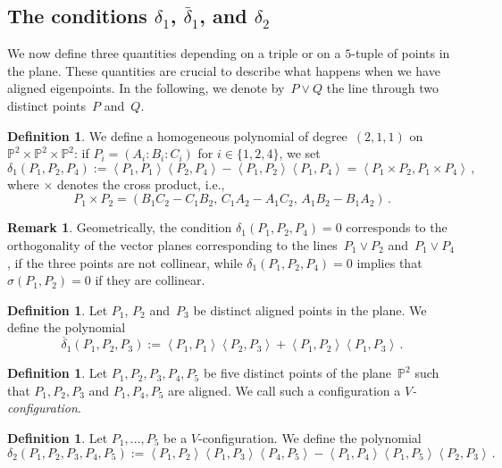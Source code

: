 \documentclass[a4paper, 11pt, reqno]{amsart}
\theoremstyle{plain}
\theoremstyle{definition}
\newtheorem{definition}[lemma]{Definition}
\newtheorem{rmk}[lemma]{Remark}
\newcommand{\p}{\mathbb{P}}
\newcommand{\scl}[2]{\left\langle {#1}, {#2} \right\rangle}
\begin{document}
\subsection{The conditions \texorpdfstring{$\delta_1$}{delta1}, \texorpdfstring{$\bar{\delta}_1$}{deltabar1}, and \texorpdfstring{$\delta_2$}{delta2}}

We now define three quantities depending on a triple or on a $5$-tuple of points in the plane.
These quantities are crucial to describe what happens when we have aligned eigenpoints.
In the following, we denote by~$P \vee Q$ the line through two distinct points~$P$ and~$Q$.

\begin{definition}
\label{definition:delta1}
We define a homogeneous polynomial of degree~$(2,1,1)$ on $\p^2 \times \p^2 \times \p^2$:
if $P_i = (A_i: B_i: C_i)$ for $i \in \{1, 2, 4\}$, we set
%
\[
  \delta_1(P_1, P_2, P_4) :=
  \scl{P_1}{P_1} \scl{P_2}{P_4} - \scl{P_1}{P_2}\scl{P_1}{P_4} =
  \scl{P_1\times P_2}{P_1 \times P_4} \,,
\]
%
where $\times$ denotes the cross product, i.e.,
%
\[
  P_1 \times P_2 = 
  (B_1 C_2 - C_1 B_2, \, C_1 A_2 - A_1 C_2, \, A_1 B_2 - B_1 A_2) \,.
\]
%
\end{definition}

\begin{rmk}
\label{rmk:delta1_meaning}
Geometrically, the condition $\delta_1(P_1, P_2, P_4) = 0$ corresponds to the orthogonality of the vector planes corresponding to the lines~$P_1 \vee P_2$ and~$P_1 \vee P_4$, if the three points are not collinear, while
$\delta_1(P_1, P_2, P_4) = 0$ implies that $\sigma (P_1,P_2)=0$ if they are collinear.
\end{rmk}

\begin{definition}
\label{definition:delta1b}
Let $P_1$, $P_2$ and~$P_3$ be distinct aligned points in the plane.
We define the polynomial
%
\[
  \overline{\delta}_1(P_1, P_2, P_3) :=
  \scl{P_1}{P_1} \scl{P_2}{P_3} + \scl{P_1}{P_2}\scl{P_1}{P_3} \,.
\]
%
\end{definition}

\begin{definition}
\label{definition:Vconf}
Let $P_1, P_2, P_3, P_4, P_5$ be five distinct points of the plane~$\p^2$
such that $P_1, P_2, P_3$ and $P_1, P_4, P_5$ are aligned.
We call such a configuration a \emph{$V$-configuration}.
\end{definition}

\begin{definition}
Let $P_1, \dots, P_5$ be a $V$-configuration.
We define the polynomial
%
\[
  \delta_2(P_1, P_2, P_3, P_4, P_5) :=
  \scl{P_1}{P_2} \scl{P_1}{P_3} \scl{P_4}{P_5} -
  \scl{P_1}{P_4} \scl{P_1}{P_5} \scl{P_2}{P_3} \,.
\]
%
\end{definition}
\end{document}
